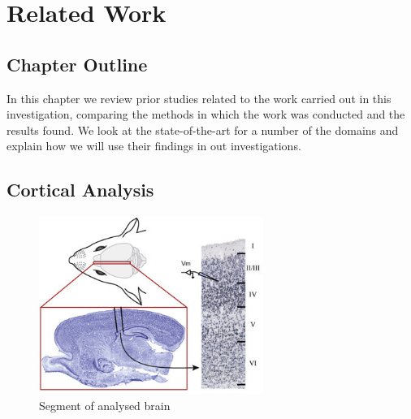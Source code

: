 \chapter{Related Work}
\label{chap:relWork}
\section*{Chapter Outline}
In this chapter we review prior studies related to the work carried out in this investigation, comparing the methods in which the work was conducted and the results found. We look at the state-of-the-art for a number of the domains and explain how we will use their findings in out investigations.


\section{Cortical Analysis}

\begin{figure}
    \centering
    \includegraphics[width=0.65\textwidth]{03-Related_Work/ratbrain2.jpg}
    \caption{Segment of analysed brain \cite{reconSim}}
    \label{fig:ratbrain}
\end{figure}

